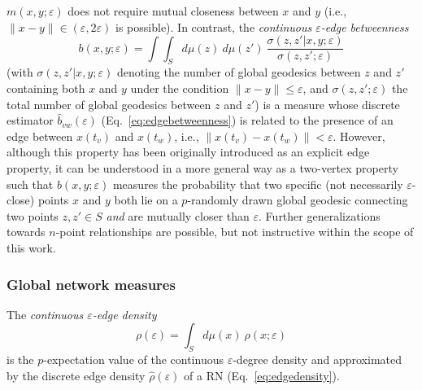 \documentclass[graybox]{svmult}
\begin{document}
$m(x,y;\varepsilon)$ does not require mutual closeness between $x$ and $y$ (i.e., $\|x-y\|\in(\varepsilon,2\varepsilon)$ is possible). In contrast, the \emph{continuous $\varepsilon$-edge betweenness}
\begin{equation}
b(x,y;\varepsilon)=\int\int_S d\mu(z)\ d\mu(z')\ \frac{\sigma(z,z'|x,y;\varepsilon)}{\sigma(z,z';\varepsilon)}
\end{equation}
\noindent
(with $\sigma(z,z'|x,y;\varepsilon)$ denoting the number of global geodesics between $z$ and $z'$ containing both $x$ and $y$ under the condition $\|x-y\|\leq\varepsilon$, and $\sigma(z,z';\varepsilon)$ the total number of global geodesics between $z$ and $z'$) is a measure whose discrete estimator $\hat{b}_{vw}(\varepsilon)$ (Eq.~\ref{eq:edgebetweenness}) is related to the presence of an edge between $x(t_v)$ and $x(t_w)$, i.e., $\|x(t_v)-x(t_w)\|< \varepsilon$. However, although this property has been originally introduced as an explicit edge property, it can be understood in a more general way as a two-vertex property such that $b(x,y;\varepsilon)$ measures the probability that two specific (not necessarily $\varepsilon$-close) points $x$ and $y$ both lie on a $p$-randomly drawn global geodesic connecting two points $z,z'\in S$ \emph{and} are mutually closer than $\varepsilon$. Further generalizations towards $n$-point relationships are possible, but not instructive within the scope of this work.


\subsubsection{Global network measures}

The \emph{continuous $\varepsilon$-edge density}
\begin{equation}
\rho(\varepsilon)=\int_S d\mu(x)\ \rho(x;\varepsilon)
\end{equation}
\noindent
is the $p$-expectation value of the continuous $\varepsilon$-degree density and approximated by the discrete edge density $\hat{\rho}(\varepsilon)$ of a RN (Eq.~\ref{eq:edgedensity}).
\end{document}
